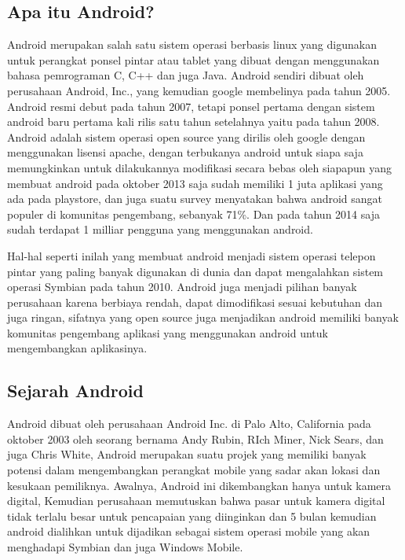 \subsection{Apa itu Android?}
Android merupakan salah satu sistem operasi berbasis linux yang digunakan untuk perangkat ponsel pintar atau tablet yang dibuat dengan menggunakan bahasa pemrograman C, C++ dan juga Java. Android sendiri dibuat oleh perusahaan Android, Inc., yang kemudian google membelinya pada tahun 2005. Android resmi debut pada tahun 2007, tetapi ponsel pertama dengan sistem android baru pertama kali rilis satu tahun setelahnya yaitu pada tahun 2008. Android adalah sistem operasi open source yang dirilis oleh google dengan menggunakan lisensi apache, dengan terbukanya android untuk siapa saja memungkinkan untuk dilakukannya modifikasi secara bebas oleh siapapun yang membuat android pada oktober 2013 saja sudah memiliki 1 juta aplikasi yang ada pada playstore, dan juga suatu survey menyatakan bahwa android sangat populer di komunitas pengembang, sebanyak 71\%. Dan pada tahun 2014 saja sudah terdapat 1 milliar pengguna yang menggunakan android.

Hal-hal seperti inilah yang membuat android menjadi sistem operasi telepon pintar yang paling banyak digunakan di dunia dan dapat mengalahkan sistem operasi Symbian pada tahun 2010. Android juga menjadi pilihan banyak perusahaan karena berbiaya rendah, dapat dimodifikasi sesuai kebutuhan dan juga ringan, sifatnya yang open source juga menjadikan android memiliki banyak komunitas pengembang aplikasi yang menggunakan android untuk mengembangkan aplikasinya.

\subsection{Sejarah Android}
Android dibuat oleh perusahaan Android Inc. di Palo Alto, California pada oktober 2003 oleh seorang bernama Andy Rubin, RIch Miner, Nick Sears, dan juga Chris White, Android merupakan suatu projek yang memiliki banyak potensi dalam mengembangkan perangkat mobile yang sadar akan lokasi dan kesukaan pemiliknya. Awalnya, Android ini dikembangkan hanya untuk kamera digital, Kemudian perusahaan memutuskan bahwa pasar untuk kamera digital tidak terlalu besar untuk pencapaian yang diinginkan dan 5 bulan kemudian android dialihkan untuk dijadikan sebagai sistem operasi mobile yang akan menghadapi Symbian dan juga Windows Mobile.


